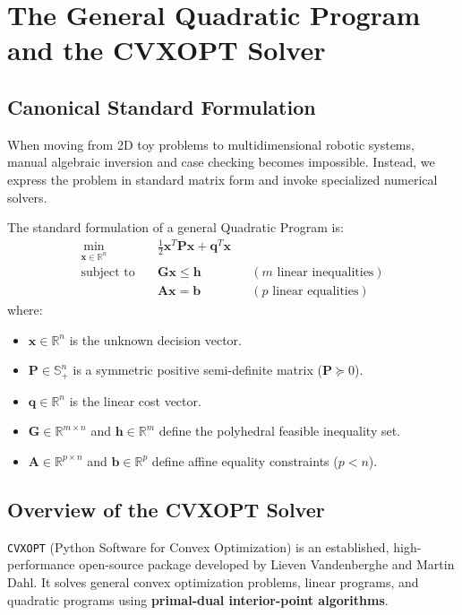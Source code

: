 \documentclass[11pt,a4paper]{article}
\begin{document}
\section{The General Quadratic Program and the CVXOPT Solver}

\subsection{Canonical Standard Formulation}
When moving from 2D toy problems to multidimensional robotic systems, manual algebraic inversion and case checking becomes impossible. Instead, we express the problem in standard matrix form and invoke specialized numerical solvers.

\begin{definitionbox}
The standard formulation of a general Quadratic Program is:
\begin{align}
\min_{\mathbf{x} \in \mathbb{R}^n} \quad & \frac{1}{2} \mathbf{x}^T \mathbf{P} \mathbf{x} + \mathbf{q}^T \mathbf{x} \label{eq:canonical_qp} \\
\text{subject to} \quad & \mathbf{G} \mathbf{x} \le \mathbf{h} \quad && (\text{$m$ linear inequalities}) \nonumber \\
& \mathbf{A} \mathbf{x} = \mathbf{b} \quad && (\text{$p$ linear equalities}) \nonumber
\end{align}
where:
\begin{itemize}
    \item $\mathbf{x} \in \mathbb{R}^n$ is the unknown decision vector.
    \item $\mathbf{P} \in \mathbb{S}^n_+$ is a symmetric positive semi-definite matrix ($\mathbf{P} \succeq 0$).
    \item $\mathbf{q} \in \mathbb{R}^n$ is the linear cost vector.
    \item $\mathbf{G} \in \mathbb{R}^{m \times n}$ and $\mathbf{h} \in \mathbb{R}^m$ define the polyhedral feasible inequality set.
    \item $\mathbf{A} \in \mathbb{R}^{p \times n}$ and $\mathbf{b} \in \mathbb{R}^p$ define affine equality constraints ($p < n$).
\end{itemize}
\end{definitionbox}

\subsection{Overview of the CVXOPT Solver}
\texttt{CVXOPT} (Python Software for Convex Optimization) is an established, high-performance open-source package developed by Lieven Vandenberghe and Martin Dahl. It solves general convex optimization problems, linear programs, and quadratic programs using \textbf{primal-dual interior-point algorithms}.
\end{document}
